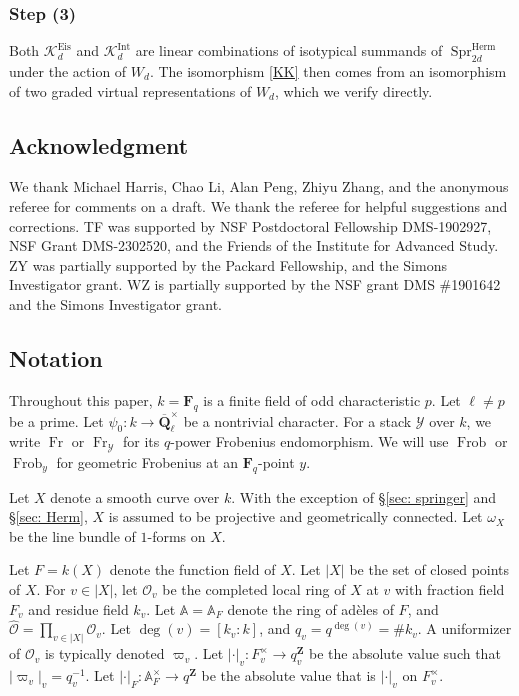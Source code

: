 \documentclass[reqno]{amsart}
\numberwithin{equation}{section}
\newcommand{\BA}{\ensuremath{\mathbb{A}}\xspace}
\newcommand{\F}{\mathbf{F}}
\newcommand{\Q}{\mathbf{Q}}
\newcommand{\Z}{\mathbf{Z}}
\newcommand{\wh}[1]{\widehat{#1}}
\DeclareMathOperator{\gFrob}{Frob}
\DeclareMathOperator{\Fr}{Fr}
\DeclareMathOperator{\Eis}{Eis}
\DeclareMathOperator{\Herm}{Herm}
\DeclareMathOperator{\Spr}{Spr}
\DeclareMathOperator{\Int}{Int}
\newcommand{\Qlbar}{\overline{\Q}_\ell}
\newcommand{\vp}{\varpi}
\newcommand{\om}{\omega}
\newcommand\cK{\mathcal{K}}
\newcommand\cO{\mathcal{O}}
\newcommand\cY{\mathcal{Y}}
\theoremstyle{remark}
\numberwithin{equation}{section}
\begin{document}
\subsubsection{Step (3)} Both $\cK^{\Eis}_{d}$ and $\cK^{\Int}_{d}$ are linear combinations of isotypical summands of $\Spr^{\Herm}_{2d}$ under the action of $W_{d}$. The isomorphism \eqref{KK} then comes from an isomorphism of two graded virtual representations of $W_{d}$, which we verify directly.  


\subsection*{Acknowledgment}

We thank Michael Harris, Chao Li, Alan Peng, Zhiyu Zhang, and the anonymous referee for comments on a draft. We thank the referee for helpful suggestions and corrections. TF was supported by NSF Postdoctoral Fellowship DMS-1902927, NSF Grant DMS-2302520, and the Friends of the Institute for Advanced Study.  ZY was partially supported by the Packard Fellowship, and the Simons Investigator grant. WZ is partially supported by the NSF grant DMS \#1901642  and the Simons Investigator grant. 


\subsection{Notation}\label{ssec: notation}

Throughout this paper, $k=\F_{q}$ is a finite field of odd characteristic $p$. Let $\ell\ne p$ be a prime.   Let $\psi_{0}: k\to\Qlbar^{\times}$ be a nontrivial character. For a stack $\cY$ over $k$, we write $\Fr$ or $\Fr_{\cY}$ for its $q$-power Frobenius endomorphism. We will use $\gFrob$ or $\gFrob_{y}$ for geometric Frobenius at an $\F_{q}$-point $y$. 

Let $X$ denote a smooth curve over $k$. With the exception of \S\ref{sec: springer} and \S\ref{sec: Herm}, $X$ is assumed to be projective and geometrically connected. Let $\om_{X}$ be the line bundle of $1$-forms on $X$. 

Let $F=k(X)$ denote the function field of $X$.  Let $|X|$ be the set of closed points of $X$. For $v\in |X|$, let $\cO_{v}$ be the completed local ring of $X$ at $v$ with fraction field $F_{v}$ and residue field $k_{v}$.   Let $\BA=\BA_{F}$ denote the ring of ad\`eles of $F$, and $\wh\cO=\prod_{v\in |X|}\cO_{v}$. Let $\deg(v)=[k_{v}:k]$, and $q_{v}=q^{\deg(v)}=\#k_{v}$. A uniformizer of $\cO_{v}$ is typically denoted $\vp_{v}$. Let $|\cdot|_{v}: F^{\times}_{v}\to q^{\Z}_{v}$ be the absolute value such that  $|\vp_{v}|_{v}=q^{-1}_{v}$. Let $|\cdot|_{F}: \BA_{F}^{\times}\to q^{\Z}$ be the absolute value that is $|\cdot|_{v}$ on $F_{v}^{\times}$.
\end{document}
